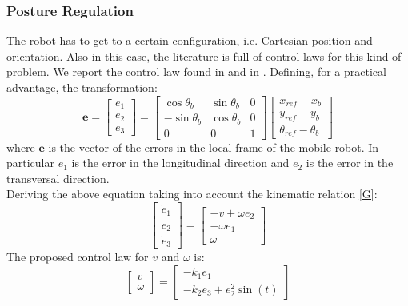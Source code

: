 \subsubsection{Posture Regulation}
The robot has to get to a certain configuration, i.e. Cartesian position and orientation. 
Also in this case, the literature is full of control laws for this kind of problem. We report the control law found in \cite{dixon} and in \cite{samson}.
Defining, for a practical advantage, the transformation:
\begin{equation} \label{trackingerrortransformation}
 	\mathbf{e}=
 	\left[\begin{matrix}
		e_1\\e_2\\e_3
	\end{matrix}\right] = 
	\left[\begin{matrix}
		\cos\theta_b & \sin\theta_b & 0 \\
		-\sin\theta_b & \cos\theta_b & 0 \\
		0 & 0 & 1
	\end{matrix}\right]
	\left[\begin{matrix}
	x_{ref}-x_b\\y_{ref}-y_b\\\theta_{ref}-\theta_b
	\end{matrix}\right]
\end{equation}
where $\mathbf{e}$ is the vector of the errors in the local frame of the mobile robot. In particular $e_1$ is the error in the longitudinal direction and $e_2$ is the error in the transversal direction.\\ Deriving the above equation taking into account the kinematic relation \ref{G}:
\begin{equation}
	\left[\begin{matrix}
		\dot{e}_1\\\dot{e}_2\\\dot{e}_3
	\end{matrix}\right] = 
	\left[\begin{matrix}
		-v+\omega e_2\\-\omega e_1\\\omega
	\end{matrix}\right]
\end{equation}
The proposed control law for $v$ and $\omega$ is:
\begin{equation}
	\left[\begin{matrix}
	v\\\omega
	\end{matrix}\right] = 
	\left[\begin{matrix}
	-k_1e_1\\-k_2e_3+e_2^2\sin(t)
	\end{matrix}\right]
\end{equation}
